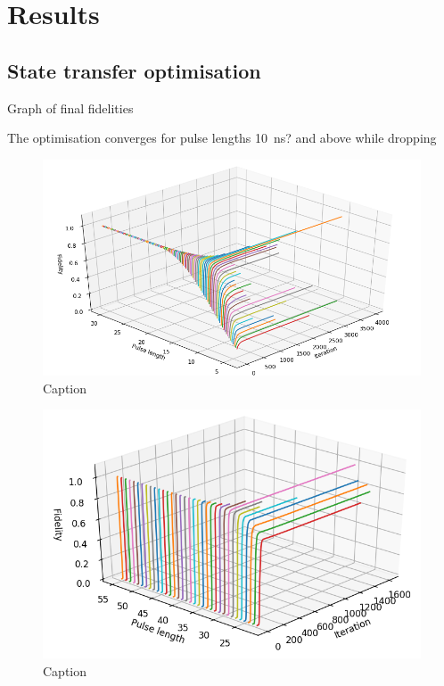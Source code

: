 \documentclass[main.tex]{subfiles}
\begin{document}
\chapter{Results}

\section{State transfer optimisation}
Graph of final fidelities

The optimisation converges for pulse lengths \SI{10}{\nano\second}? and above while dropping 

\begin{figure}
    \centering
    \includegraphics[width=\linewidth]{figs/3d-optim-ge.png}
    \caption{Caption}
    \label{fig:3d-optim-ge}
\end{figure}

\begin{figure}
    \centering
    \includegraphics[width=0.7\linewidth]{figs/3d-optim-gf.png}
    \caption{Caption}
    \label{fig:3d-optim-gf}
\end{figure}

\end{document}
